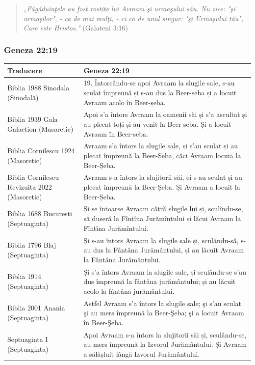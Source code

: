 \documentclass[12pt,a4paper]{article}
\begin{document}
\begin{quote}
    \textit{„Făgăduinţele au fost rostite lui Avraam şi urmaşului său. Nu zice: "şi urmaşilor", - ca de mai mulţi, - ci ca de unul singur: "şi Urmaşului tău", Care este Hristos."} \hfill (Galateni 3:16)
\end{quote}

\subsubsection{Geneza 22:19}

\begin{longtable}{|p{3cm}|L|}
    \hline
    \textbf{Traducere}                           & \textbf{Geneza 22:19}                                                                                                                                 \\
    \hline
    Biblia 1988 Sinodala (Sinodală)              & 19. Întorcându-se apoi Avraam la slugile sale, s-au sculat împreună și s-au dus la Beer-șeba și a locuit Avraam acolo în Beer-șeba.                   \\
    \hline
    Biblia 1939 Gala Galaction (Masoretic)       & Apoi s'a întors Avraam la oamenii săi și s'a ascultat și au plecat toți și au venit la Beer-seba. Și a locuit Avraam în Beer-seba.                    \\
    \hline
    Biblia Cornilescu 1924 (Masoretic)           & Avraam s'a întors la slugile sale, și s'au sculat și au plecat împreună la Beer-Șeba, căci Avraam locuia la Beer-Șeba.                                \\
    \hline
    Biblia Cornilescu Revizuita 2022 (Masoretic) & Avraam s-a întors la slujitorii săi, ei s-au sculat și au plecat împreună la Beer-Șeba. Și Avraam a locuit la Beer-Șeba.                              \\
    \hline
    Biblia 1688 Bucuresti (Septuaginta)          & Și se întoarse Avraam cătră slugile lui și, sculîndu-se, să duseră la Fîntîna Jurămîntului și lăcui Avraam la Fîntîna Jurămîntului.                   \\
    \hline
    Biblia 1796 Blaj (Septuaginta)               & Și s-au întors Avraam la slugile sale și, sculându-să, s-au dus la Fântâna Jurământului, și au lăcuit Avraam la Fântâna Jurământului.                 \\
    \hline
    Biblia 1914 (Septuaginta)                    & Și s'a întors Avraam la slugile sale, și sculându-se s'au dus împreună la fântâna jurământului; și au lăcuit acolo la fântâna jurământului.           \\
    \hline
    Biblia 2001 Anania (Septuaginta)             & Astfel Avraam s’a întors la slugile sale; şi s’au sculat şi au mers împreună la Beer-Şeba; şi a locuit Avraam în Beer-Şeba.                           \\
    \hline
    Septuaginta I (Septuaginta)                  & Apoi Avraam s-a întors la slujitorii săi și, sculându-se, au mers împreună la Izvorul Jurământului. Și Avraam a sălășluit lângă Izvorul Jurământului. \\
    \hline
\end{longtable}
\end{document}
